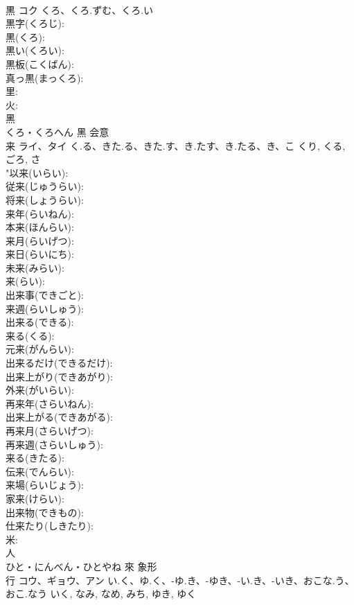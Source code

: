 \documentclass[8pt]{extreport}
\begin{document}
\begin{CJK}{UTF8}{min}
\\	黒	コク	くろ、くろ.ずむ、くろ.い		
\\	黒字(くろじ): 
\\	黒(くろ): 
\\	黒い(くろい): 
\\	黒板(こくばん): 
\\	真っ黒(まっくろ): 
\\	里: 
\\	火: 
\\	黑	
\\	くろ・くろへん	黑	会意 
\\	来	ライ、タイ	く.る、きた.る、きた.す、き.たす、き.たる、き、こ	くり, くる, ごろ, さ	
\\	"以来(いらい): 
\\	従来(じゅうらい): 
\\	将来(しょうらい): 
\\	来年(らいねん): 
\\	本来(ほんらい): 
\\	来月(らいげつ): 
\\	来日(らいにち): 
\\	未来(みらい): 
\\	来(らい): 
\\	出来事(できごと): 
\\	来週(らいしゅう): 
\\	出来る(できる): 
\\	来る(くる): 
\\	元来(がんらい): 
\\	出来るだけ(できるだけ): 
\\	出来上がり(できあがり): 
\\	外来(がいらい): 
\\	再来年(さらいねん): 
\\	出来上がる(できあがる): 
\\	再来月(さらいげつ): 
\\	再来週(さらいしゅう): 
\\	来る(きたる): 
\\	伝来(でんらい): 
\\	来場(らいじょう): 
\\	家来(けらい): 
\\	出来物(できもの): 
\\	仕来たり(しきたり): 
\\	米: 
\\	人	
\\	ひと・にんべん・ひとやね	來	象形 
\\	行	コウ、ギョウ、アン	い.く、ゆ.く、-ゆ.き、-ゆき、-い.き、-いき、おこな.う、おこ.なう	いく, なみ, なめ, みち, ゆき, ゆく	

\end{CJK}
\end{document}
